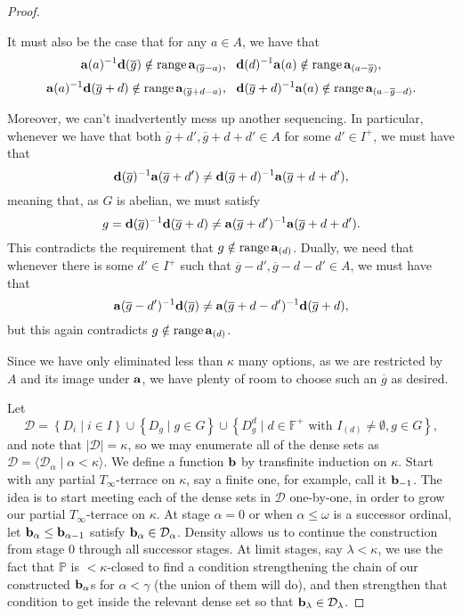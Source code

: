 \documentclass[12pt,a4paper]{article}
\newcommand{\F}{\mathbb{F}}
\DeclareMathOperator{\ran}{range}
\newcommand{\st}{\; | \;}
\newcommand{\set}[2]{\left\{#1\st #2 \right\}}
\newcommand{\seq}[2]{\langle #1 \st #2 \rangle}
\renewcommand{\P}{\mathbb{P}}
\renewcommand{\a}{\textup{\textbf{a}}}
\renewcommand{\b}{\textup{\textbf{b}}}
\renewcommand{\d}{\textup{\textbf{d}}}
\begin{document}
\begin{proof}
\begin{enumerate}
	It must also be the case that for any $a \in A$, we have that 
		$$\a(a)^{-1}\d(\overline g) \notin \ran \a_{(\overline g-a)}, \ \  \d(d)^{-1}\a(a) \notin \ran \a_{(a-\overline g)},$$ 
		$$\a(a)^{-1}\d(\overline g+d)  \notin \ran \a_{(\overline g+d-a)}, \ \ \d(\overline g+d)^{-1}\a(a) \notin \ran \a_{(a-\overline g-d)}.$$

Moreover, we can't inadvertently mess up another sequencing. In particular, whenever we have that both $\overline g+d', \overline g+d+d'\in A$ for some $d'\in I^+$, we must have that $$\d(\overline g)^{-1}\a(\overline g+d') \neq \d(\overline g+d)^{-1}\a(\overline g+d+d'),$$ meaning that, as $G$ is abelian, we must satisfy $$g= \d(\overline g)^{-1}\d(\overline g+d) \neq \a(\overline g+d')^{-1}\a(\overline g+d+d').$$ This contradicts the requirement that $g \notin \ran \a_{(d)}$. Dually, we need that whenever there is some $d'\in I^+$ such that $\overline g-d', \overline g-d-d' \in A$, we must have that $$\a(\overline g-d')^{-1}\d(\overline g) \neq \a(\overline g+d-d')^{-1}\d(\overline g+d),$$ but this again contradicts $g \notin \ran \a_{(d)}$.

Since we have only eliminated less than $\kappa$ many options, as we are restricted by $A$ and its image under $\a$, we have plenty of room to choose such an $\overline g$ as desired.\\
\end{enumerate}

Let $$\mathcal D = \set{D_i}{i\in I} \cup \set{D_g}{g\in G} \cup \set{D^d_g}{d \in \F^+\text{ with } I_{(d)}\neq \emptyset, g \in G},$$ and note that $|\mathcal D|=\kappa$, so we may enumerate all of the dense sets as $\mathcal D = \seq{\mathcal D_\alpha}{\alpha<\kappa}$. 
We define a function $\b$ by transfinite induction on $\kappa$. Start with any partial $T_\infty$-terrace on $\kappa$, say a finite one, for example, call it $\b_{-1}$.
The idea is to start meeting each of the dense sets in $\mathcal D$ one-by-one, in order to grow our partial $T_\infty$-terrace on $\kappa$. At stage $\alpha=0$ or when $\alpha \leq \omega$ is a successor ordinal, let $\b_\alpha \leq \b_{\alpha-1}$ satisfy $\b_\alpha \in \mathcal D_\alpha$. Density allows us to continue the construction from stage $0$ through all successor stages. At limit stages, say $\lambda <\kappa$, we use the fact that $\P$ is $<\kappa$-closed to find a condition strengthening the chain of our constructed $\b_\alpha$s for $\alpha<\gamma$ (the union of them will do), and then strengthen that condition to get inside the relevant dense set so that $\b_\lambda \in \mathcal D_\lambda$. 


\end{proof}
\end{document}
